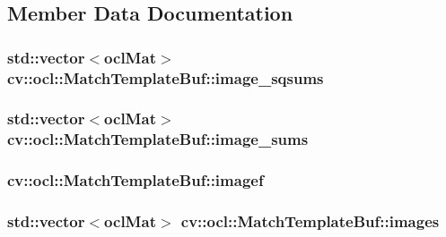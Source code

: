 \subsection{Member Data Documentation}
\hypertarget{structcv_1_1ocl_1_1MatchTemplateBuf_ae57f603ce6493fc33311a697d3c6a9ad}{
\subsubsection[{image\-\_\-sqsums}]{\setlength{\rightskip}{0pt plus 5cm}std\-::vector$<${\bf ocl\-Mat}$>$ cv\-::ocl\-::\-Match\-Template\-Buf\-::image\-\_\-sqsums}}\label{structcv_1_1ocl_1_1MatchTemplateBuf_ae57f603ce6493fc33311a697d3c6a9ad}
\hypertarget{structcv_1_1ocl_1_1MatchTemplateBuf_abcdb92fb2c021b9336d87e65cd40f30c}{
\subsubsection[{image\-\_\-sums}]{\setlength{\rightskip}{0pt plus 5cm}std\-::vector$<${\bf ocl\-Mat}$>$ cv\-::ocl\-::\-Match\-Template\-Buf\-::image\-\_\-sums}}\label{structcv_1_1ocl_1_1MatchTemplateBuf_abcdb92fb2c021b9336d87e65cd40f30c}
\hypertarget{structcv_1_1ocl_1_1MatchTemplateBuf_a4646b074f758c75de0d7b09d00847e52}{
\subsubsection[{imagef}]{ cv\-::ocl\-::\-Match\-Template\-Buf\-::imagef}}\label{structcv_1_1ocl_1_1MatchTemplateBuf_a4646b074f758c75de0d7b09d00847e52}
\hypertarget{structcv_1_1ocl_1_1MatchTemplateBuf_afd5853ee21092ac4887cf98e13af666d}{
\subsubsection[{images}]{\setlength{\rightskip}{0pt plus 5cm}std\-::vector$<${\bf ocl\-Mat}$>$ cv\-::ocl\-::\-Match\-Template\-Buf\-::images}}\label{structcv_1_1ocl_1_1MatchTemplateBuf_afd5853ee21092ac4887cf98e13af666d}

